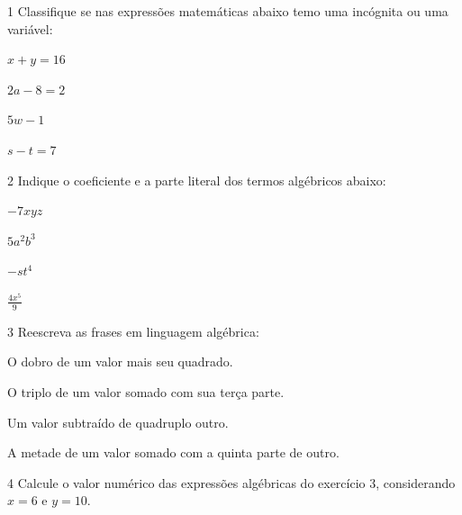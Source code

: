 \num{1} Classifique se nas expressões matemáticas abaixo temo uma incógnita
ou uma variável:

\begin{escolha}[itemsep=0pt]
\item $x + y = 16$  
\item $2a - 8 = 2$  
\item $5w - 1$  
\item $s - t = 7$ 
\end{escolha}

\num{2} Indique o coeficiente e a parte literal dos termos algébricos abaixo:

\begin{escolha}[itemsep=0pt]
\item $- 7xyz$  
\item $5a^2b^3$  
\item $- st^{4}$  
\item $\frac{4x^{5}}{9}$ 
\end{escolha}

\num{3} Reescreva as frases em linguagem algébrica:
\begin{escolha}[itemsep=0pt]
\item O dobro de um valor mais seu quadrado.  
\item O triplo de um valor somado com sua terça parte.  
\item Um valor subtraído de quadruplo outro.  
\item A metade de um valor somado com a quinta parte de outro. 
\end{escolha}

\num{4} Calcule o valor numérico das expressões algébricas do exercício 3,
considerando $x = 6$ e $y = 10$.


